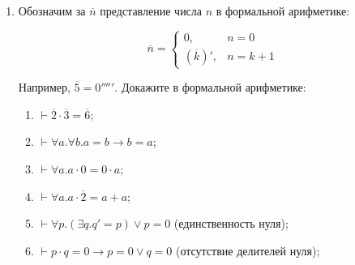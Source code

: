 \documentclass[10pt,a4paper,oneside]{article}
\begin{document}
\begin{enumerate}
\item Обозначим за $\overline{n}$ представление числа $n$ в формальной арифметике: %

$$\overline{n} = \left\{\begin{array}{ll}0, &n = 0\\
           \left(\overline{k}\right)', & n=k+1\end{array}\right.$$

Например, $\overline{5} = 0'''''$. Докажите в формальной арифметике:
\begin{enumerate}
\item $\vdash \overline{2} \cdot \overline{3} = \overline{6}$;
\item $\vdash \forall a.\forall b.a = b \rightarrow b = a$;
\item $\vdash \forall a.a \cdot 0 = 0 \cdot a$;
\item $\vdash \forall a.a \cdot \overline{2} = a + a$;
\item $\vdash \forall p.(\exists q.q' = p) \vee p = 0$ (единственность нуля);
\item $\vdash p \cdot q = 0 \rightarrow p = 0 \vee q = 0$ (отсутствие делителей нуля);
\end{enumerate}
\end{enumerate}
\end{document}
